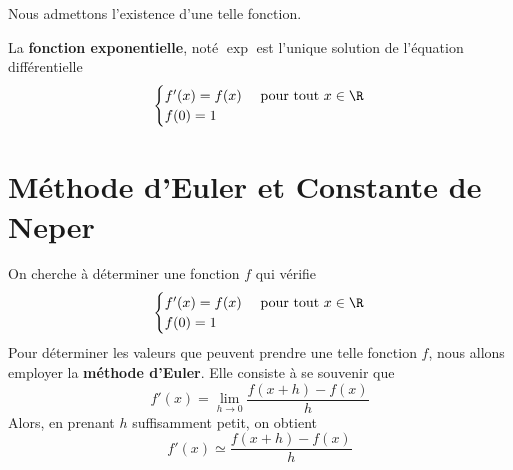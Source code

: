 \documentclass{article}
\begin{document}
Nous admettons l'existence d'une telle fonction.
\begin{tcolorbox}
\begin{definition}
La \textbf{fonction exponentielle}, noté $\exp$ est l'unique solution de l'équation différentielle
\begin{equation*}
\begin{cases}
f'(x) = f(x)& \text{ pour tout } x \in \R\\
f(0) = 1
\end{cases}
\end{equation*}
\end{definition}
\end{tcolorbox}
\newpage
\maketitle
\section{Méthode d'Euler et Constante de Neper}
On cherche à déterminer une fonction $f$ qui vérifie
\begin{equation*}
\begin{cases}
f'(x) = f(x)& \text{ pour tout } x \in \R\\
f(0) = 1
\end{cases}
\end{equation*}
Pour déterminer les valeurs que peuvent prendre une telle fonction $f$, nous allons employer la \textbf{méthode d'Euler}. Elle consiste à se souvenir que
\begin{equation*}
f'(x) = \lim_{h \to 0} \dfrac{f(x + h) - f(x)}{h}
\end{equation*}
Alors, en prenant $h$ suffisamment petit, on obtient 
\begin{equation}
\label{Euler}
f'(x) \simeq \dfrac{f(x + h) - f(x)}{h} 
\end{equation}
\end{document}
